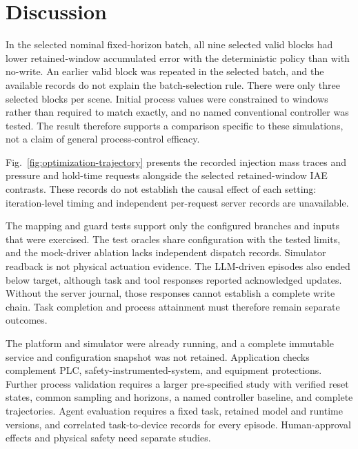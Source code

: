 \section{Discussion}
\label{sec:discussion}
In the selected nominal fixed-horizon batch, all nine selected valid blocks had lower retained-window accumulated error with the deterministic policy than with no-write. An earlier valid block was repeated in the selected batch, and the available records do not explain the batch-selection rule. There were only three selected blocks per scene. Initial process values were constrained to windows rather than required to match exactly, and no named conventional controller was tested. The result therefore supports a comparison specific to these simulations, not a claim of general process-control efficacy.

Fig.~\ref{fig:optimization-trajectory} presents the recorded injection mass traces and pressure and hold-time requests alongside the selected retained-window IAE contrasts. These records do not establish the causal effect of each setting: iteration-level timing and independent per-request server records are unavailable.

The mapping and guard tests support only the configured branches and inputs that were exercised. The test oracles share configuration with the tested limits, and the mock-driver ablation lacks independent dispatch records. Simulator readback is not physical actuation evidence. The LLM-driven episodes also ended below target, although task and tool responses reported acknowledged updates. Without the server journal, those responses cannot establish a complete write chain. Task completion and process attainment must therefore remain separate outcomes.

The platform and simulator were already running, and a complete immutable service and configuration snapshot was not retained. Application checks complement PLC, safety-instrumented-system, and equipment protections. Further process validation requires a larger pre-specified study with verified reset states, common sampling and horizons, a named controller baseline, and complete trajectories. Agent evaluation requires a fixed task, retained model and runtime versions, and correlated task-to-device records for every episode. Human-approval effects and physical safety need separate studies.

